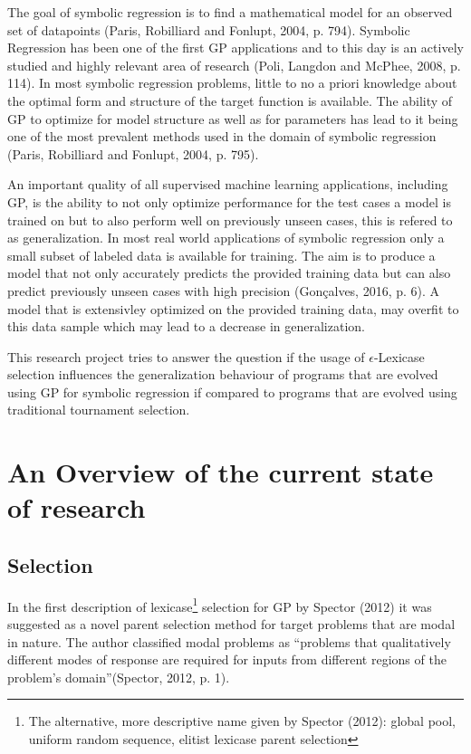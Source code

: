 \documentclass[
  12pt,
]{article}
\begin{document}
The goal of symbolic regression is to find a mathematical model for an
observed set of datapoints (Paris, Robilliard and Fonlupt, 2004, p.
794). Symbolic Regression has been one of the first GP applications and
to this day is an actively studied and highly relevant area of research
(Poli, Langdon and McPhee, 2008, p. 114). In most symbolic regression
problems, little to no a priori knowledge about the optimal form and
structure of the target function is available. The ability of GP to
optimize for model structure as well as for parameters has lead to it
being one of the most prevalent methods used in the domain of symbolic
regression (Paris, Robilliard and Fonlupt, 2004, p. 795).

An important quality of all supervised machine learning applications,
including GP, is the ability to not only optimize performance for the
test cases a model is trained on but to also perform well on previously
unseen cases, this is refered to as generalization. In most real world
applications of symbolic regression only a small subset of labeled data
is available for training. The aim is to produce a model that not only
accurately predicts the provided training data but can also predict
previously unseen cases with high precision (Gonçalves, 2016, p. 6). A
model that is extensivley optimized on the provided training data, may
overfit to this data sample which may lead to a decrease in
generalization.

This research project tries to answer the question if the usage of
\(\epsilon\)-Lexicase selection influences the generalization behaviour
of programs that are evolved using GP for symbolic regression if
compared to programs that are evolved using traditional tournament
selection.

\hypertarget{an-overview-of-the-current-state-of-research}{%
\section{An Overview of the current state of
research}\label{an-overview-of-the-current-state-of-research}}

\hypertarget{selection}{%
\subsection{Selection}\label{selection}}

In the first description of lexicase\footnote{The alternative, more
  descriptive name given by Spector (2012): global pool, uniform random
  sequence, elitist lexicase parent selection} selection for GP by
Spector (2012) it was suggested as a novel parent selection method for
target problems that are modal in nature. The author classified modal
problems as ``problems that qualitatively different modes of response
are required for inputs from different regions of the problem's
domain''(Spector, 2012, p. 1).
\end{document}
